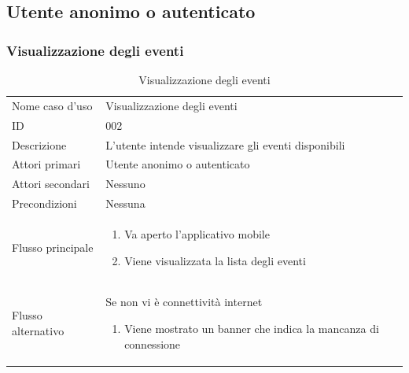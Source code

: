 \documentclass{article}
\begin{document}
\clearpage

\subsection{Utente anonimo o autenticato}

\subsubsection{Visualizzazione degli eventi}

\begin{table}[htbp]
    \label{8.2.1}
    \centering
    \begin{tabularx}{\textwidth}{| l | p{} |}
        \Xhline{2pt} %
        Nome caso d'uso & Visualizzazione degli eventi \\
        \Xhline{2pt} %
        ID & 002 \\
        \hline
        Descrizione & L'utente intende visualizzare gli eventi disponibili\\
        \hline
        Attori primari & Utente anonimo o autenticato\\
        \hline
        Attori secondari & Nessuno \\
        \hline
        Precondizioni & Nessuna \\
        \hline
        Flusso principale & 
        \begin{enumerate}[topsep=5pt,partopsep=0pt,parsep=0pt,itemsep=0pt,before=\vspace{-\baselineskip},after=\vspace{-\baselineskip}]                
            \item Va aperto l'applicativo mobile
            \item Viene visualizzata la lista degli eventi
        \end{enumerate}
        \\
        \hline
        Flusso alternativo & 
        Se non vi è connettività internet
        \begin{enumerate}[topsep=10pt,partopsep=0pt,parsep=0pt,itemsep=0pt,before=\vspace{-\baselineskip},after=\vspace{-\baselineskip}]                
            \item Viene mostrato un banner che indica la mancanza di connessione
        \end{enumerate}
        \\
        \hline
    \end{tabularx}
    \caption{Visualizzazione degli eventi}
    \label{tab:tabella_use_case002}
\end{table}
\end{document}
